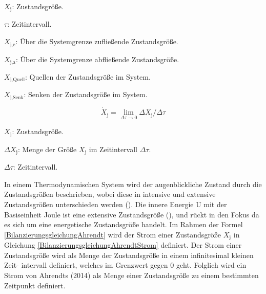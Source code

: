\begin{description}
    \item \(X_{\text{j}}\): Zustandsgröße.
    \item \(\tau\): Zeitintervall.
    \item \(X_{\text{j,e}}\): Über die Systemgrenze zufließende Zustandsgröße.
    \item \(X_{\text{j,a}}\): Über die Systemgrenze abfließende Zustandsgröße.
    \item \(X_{\text{j,Quell}}\): Quellen der Zustandsgröße im System.
    \item \(X_{\text{j,Senk}}\): Senken der Zustandsgröße im System.
\end{description}


\begin{equation}
    \dot{X}_{\text{j}} = \lim_{\Delta\tau \to 0} \Delta X_{\text{j}}/ \Delta\tau
    \label{BilanzierungsgleichungAhrendtStrom}
\end{equation}

\begin{description}
    \item \(X_{\text{j}}\): Zustandsgröße.
    \item \(\Delta X_{\text{j}}\): Menge der Größe \(X_{\text{j}}\) im Zeitintervall \(\Delta \tau\).
    \item \(\Delta \tau\): Zeitintervall.
\end{description}


In einem Thermodynamischen System wird der augenblickliche Zustand durch die Zustandsgrößen beschrieben, wobei diese in intensive und extensive Zustandsgrößen 
unterschieden werden (\cite[S. 66]{Konstantin.2023}). Die innere Energie U mit der Basiseinheit Joule ist eine extensive Zustandsgröße (\cite[S. 65]{Konstantin.2023}), und rückt in den 
Fokus da es sich um eine energetische Zustandsgröße handelt. 
Im Rahmen der Formel \eqref{BilanzierungsgleichungAhrendt} wird der Strom einer Zustandsgröße \(X_{\text{j}}\) in Gleichung 
\eqref{BilanzierungsgleichungAhrendtStrom} definiert.
Der Strom einer Zustandsgröße wird als Menge der Zustandsgröße in einem infinitesimal kleinen Zeit-
intervall definiert, welches im Grenzwert gegen 0 geht. 
Folglich wird ein Strom von Ahrendts (2014) als Menge einer Zustandsgröße zu einem bestimmten Zeitpunkt 
definiert. 

